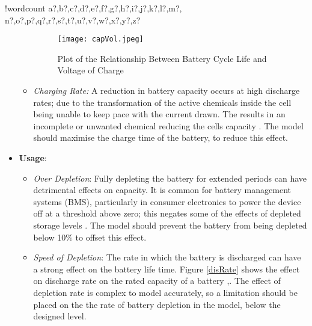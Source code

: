 \documentclass[fontsize=9.5pt]{extarticle}
\numberwithin{figure}{section} %
\providecommand{\tightlist}{%
  \setlength{\itemsep}{0pt}\setlength{\parskip}{0pt}}
\newcounter{words}
\newenvironment{counted}{%
  \setcounter{words}{0}
  \SearchList!{wordcount}{\stepcounter{words}}
    {a?,b?,c?,d?,e?,f?,g?,h?,i?,j?,k?,l?,m?,
    n?,o?,p?,q?,r?,s?,t?,u?,v?,w?,x?,y?,z?}
  \UndoBoundary{'}
  \SearchOrder{p;}}{%
  \StopSearching}
\begin{document}
\begin{counted}
\begin{itemize}
\begin{itemize}
    \begin{figure}[H]
    \centering
    \texttt{[image: capVol.jpeg]}
    \caption{Plot of the Relationship Between Battery Cycle Life and Voltage of Charge \cite{Choi2002130} }
    \label{capVol}
    \end{figure}
  \item
    \emph{Charging Rate:} A reduction in battery capacity occurs at high
    discharge rates; due to the transformation of the active chemicals
    inside the cell being unable to keep pace with the current drawn.
    The results in an incomplete or unwanted chemical reducing the cells
    capacity \cite{BatteryL10:online}. The model should maximise the
    charge time of the battery, to reduce this effect.
  \end{itemize}
\item
  \textbf{Usage}:

  \begin{itemize}
  \tightlist
  \item
    \emph{Over Depletion}: Fully depleting the battery for extended
    periods can have detrimental effects on capacity. It is common for
    battery management systems (BMS), particularly in consumer
    electronics to power the device off at a threshold above zero; this
    negates some of the effects of depleted storage levels
    \cite{Prematur82:online}. The model should prevent the battery from
    being depleted below 10\% to offset this effect.
  \item
    \emph{Speed of Depletion}: The rate in which the battery is
    discharged can have a strong effect on the battery life time. Figure
    \ref{disRate} shows the effect on discharge rate on the rated
    capacity of a battery
    \cite{BatteryL10:online},\cite{Effectso69:online}. The effect of
    depletion rate is complex to model accurately, so a limitation
    should be placed on the the rate of battery depletion in the model,
    below the designed level.


\end{itemize}
\end{itemize}
\end{counted}
\end{document}
